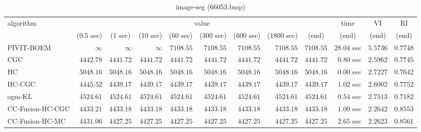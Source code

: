 \begin{table}[H]
\scriptsize
\centering
\caption{image-seg (66053.bmp)}
\label{tab:anytimetable-image-seg-66053.bmp}
\begin{tabular}{lrrrrrrrrrrr}
\toprule
           algorithm &                                   \multicolumn{8}{c}{value} & \multicolumn{1}{c}{time}    & \multicolumn{1}{c}{VI}  & \multicolumn{1}{c}{RI} \\  
\cmidrule(lr){2-9}\cmidrule(lr){10-10} \cmidrule(lr){11-11} \cmidrule(lr){12-12}   
                     & \multicolumn{1}{c}{(0.5 sec)} & \multicolumn{1}{c}{(1 sec)} & \multicolumn{1}{c}{(10 sec)} & \multicolumn{1}{c}{(60 sec)} & \multicolumn{1}{c}{(300 sec)} & \multicolumn{1}{c}{(600 sec)} & \multicolumn{1}{c}{(1800 sec)} & \multicolumn{1}{c}{(end)} & \multicolumn{1}{c}{(end)}    & \multicolumn{1}{c}{(end)}   & \multicolumn{1}{c}{(end)}  \\ \midrule 
          PIVIT-BOEM & $\infty$ & $\infty$ & $\infty$ & $      7108.55$ & $      7108.55$ & $      7108.55$ & $      7108.55$ & $      7108.55$ & $        28.04$ sec    & $       5.5736$  & $       0.7748$ \\ 
                 CGC & $      4442.78$ & $      4441.72$ & $      4441.72$ & $      4441.72$ & $      4441.72$ & $      4441.72$ & $      4441.72$ & $      4441.72$ & $         0.80$ sec    & $       2.5962$  & $       0.7745$ \\ 
                  HC & $      5048.16$ & $      5048.16$ & $      5048.16$ & $      5048.16$ & $      5048.16$ & $      5048.16$ & $      5048.16$ & $      5048.16$ & $         0.00$ sec    & $       2.7227$  & $       0.7642$ \\ 
              HC-CGC & $      4445.52$ & $      4439.17$ & $      4439.17$ & $      4439.17$ & $      4439.17$ & $      4439.17$ & $      4439.17$ & $      4439.17$ & $         1.02$ sec    & $       2.6002$  & $       0.7752$ \\ 
              ogm-KL & $      4524.61$ & $      4524.61$ & $      4524.61$ & $      4524.61$ & $      4524.61$ & $      4524.61$ & $      4524.61$ & $      4524.61$ & $         0.54$ sec    & $       2.7513$  & $       0.7182$ \\ 
    CC-Fusion-HC-CGC & $      4433.21$ & $      4433.18$ & $      4433.18$ & $      4433.18$ & $      4433.18$ & $      4433.18$ & $      4433.18$ & $      4433.18$ & $         1.00$ sec    & $       2.2642$  & $       0.8553$ \\ 
     CC-Fusion-HC-MC & $      4431.06$ & $      4427.25$ & $      4427.25$ & $      4427.25$ & $      4427.25$ & $      4427.25$ & $      4427.25$ & $      4427.25$ & $         2.65$ sec    & $       2.2623$  & $       0.8561$ \\ 

\end{tabular}
\end{table}
